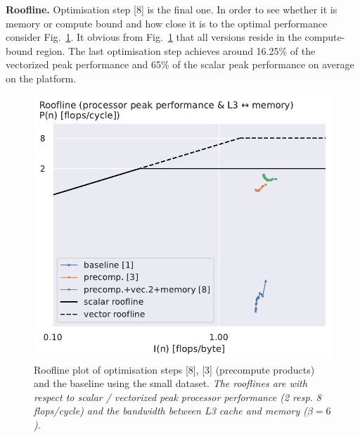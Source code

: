 \documentclass[letterpaper]{article}
\newcommand{\mypar}[1]{{\bf #1.}}
\begin{document}
\mypar{Roofline}
Optimisation step [8] is the final one.
In order to see whether it is memory or compute bound and how close it is to the optimal performance consider Fig.~\ref{rooflineEndToEndSmall}.
It obvious from Fig.~\ref{rooflineEndToEndSmall} that all versions reside in the compute-bound region.
The last optimisation step achieves around 16.25\% of the vectorized peak performance and 65\% of the scalar peak performance on average on the platform.  
\begin{figure}\centering
	\includegraphics[scale=0.59]{img/roofline[1][3][8]_small.pdf}
	\caption{Roofline plot of optimisation steps [8], [3] (precompute products) and the baseline using the small dataset.
			\emph{The rooflines are with respect to scalar / vectorized peak processor performance (2 resp. 8 flops/cycle) and the bandwidth between L3 cache and memory ($\beta = 6$). } \label{rooflineEndToEndSmall}}
\end{figure}
\end{document}
